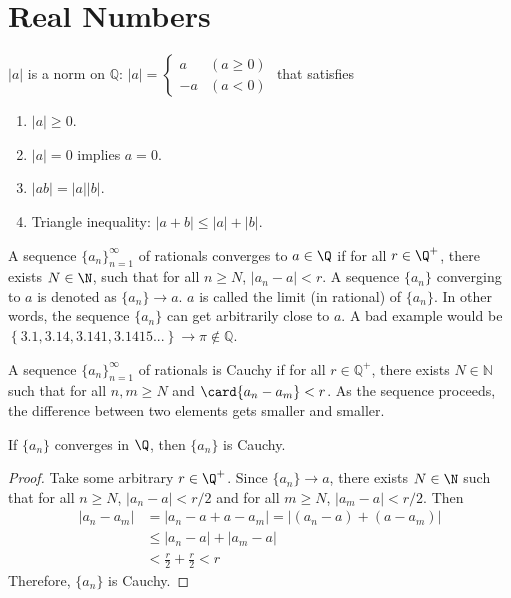 \documentclass[10pt]{article}
\begin{document}
\section{Real Numbers}
\begin{definition}[$\Q$ norm]
    $|a|$ is a norm on $\mathbb{Q}$: $|a| = 
    \begin{cases}
        a &(a \geq 0) \\
        -a &(a < 0)
    \end{cases}$ that satisfies
    \begin{enumerate}
        \item $|a|\geq 0$.
        \item $|a|=0$ implies $ a=0$.
        \item $|ab|=|a||b|$.
        \item Triangle inequality: $|a+b| \leq |a|+|b|$.
    \end{enumerate}
\end{definition}
\begin{definition}[convergence]
    A sequence $\{a_n\}_{n=1}^\infty$ of rationals converges to $a\in\Q$ if for all $ r\in\Q^+$, there exists $ N\in\N$, such that for all $ n\geq N$, $|a_n-a|<r$. A sequence $\{a_n\}$ converging to $a$ is denoted as $\{a_n\}\to a$. $a$ is called the limit (in rational) of $\{a_n\}$. In other words, the sequence $\{a_n\}$ can get arbitrarily close to $a$. A bad example would be $\left \{ 3.1, 3.14, 3.141, 3.1415... \right \}\to \pi\notin\mathbb{Q}$.
\end{definition}
\begin{definition}
    A sequence $\{a_n\}^\infty_{n=1}$ of rationals is Cauchy if for all $r\in \mathbb{Q}^+$, there exists $N\in\mathbb{N}$ such that for all $n,m\geq N$ and $\card{ a_n-a_m}<r$. As the sequence proceeds, the difference between two elements gets smaller and smaller.
\end{definition}
\begin{proposition}
    If $\{a_n\}$ converges in $\Q$, then $\{a_n\}$ is Cauchy.
\end{proposition}
\begin{proof}
    Take some arbitrary $r\in\Q^+$. Since $\{a_n\}\rightarrow a$, there exists $ N\in\N$ such that for all $n\geq N$, $|a_n-a|<{r}/{2}$ and for all $m\geq N$, $|a_m-a|<{r}/{2}$. Then
    \begin{align*}
        |a_n-a_m|&=|a_n-a+a-a_m|=|(a_n-a)+(a-a_m)|\\
                 &\leq|a_n-a|+|a_m-a|\tag{triangle inequality}\\
                 &<\frac{r}{2}+\frac{r}{2}<r
    \end{align*}
    Therefore, $\{a_n\}$ is Cauchy.
\end{proof}
\end{document}
